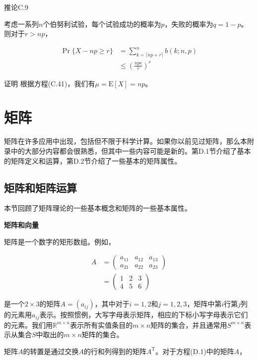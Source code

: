 \documentclass[lang=cn,newtx,10pt,scheme=chinese]{elegantbook}
\begin{document}
推论C.9

考虑一系列$n$个伯努利试验，每个试验成功的概率为$p$，失败的概率为$q=1-p$。则对于$r>n p$，

$$
\begin{aligned}
\operatorname{Pr}\{X-n p \geq r\} & =\sum_{k=\lceil n p+r\rceil}^n b(k ; n, p) \\
& \leq(\frac{n p e}{r})^r
\end{aligned}
$$

证明 根据方程(C.41)，我们有$\mu=\mathrm{E}[X]=n p$。

\chapter{矩阵}\label{chapter:D}

矩阵在许多应用中出现，包括但不限于科学计算。如果你以前见过矩阵，那么本附录中的大部分内容都会很熟悉，但其中一些内容可能是新的。第D.1节介绍了基本的矩阵定义和运算，第D.2节介绍了一些基本的矩阵属性。

\section{矩阵和矩阵运算}\label{sectoin:D.1}

本节回顾了矩阵理论的一些基本概念和矩阵的一些基本属性。

\textbf{矩阵和向量}

矩阵是一个数字的矩形数组。例如，

$$
\begin{aligned}
A & =(\begin{array}{lll}
a_{11} & a_{12} & a_{13} \\
a_{21} & a_{22} & a_{23}
\end{array}) \\
& =(\begin{array}{lll}
1 & 2 & 3 \\
4 & 5 & 6
\end{array})
\end{aligned}
$$

是一个$2 \times 3$的矩阵$A=(a_{i j})$，其中对于$i=1,2$和$j=1,2,3$，矩阵中第$i$行第$j$列的元素用$a_{i j}$表示。按照惯例，大写字母表示矩阵，相应的下标小写字母表示它们的元素。我们用$\mathbb{R}^{m \times n}$表示所有实值条目的$m \times n$矩阵的集合，并且通常用$S^{m \times n}$表示从集合$S$中取出的$m \times n$矩阵的集合。

矩阵$A$的转置是通过交换$A$的行和列得到的矩阵$A^{\mathrm{T}}$。对于方程(D.1)中的矩阵$A$，
\end{document}
